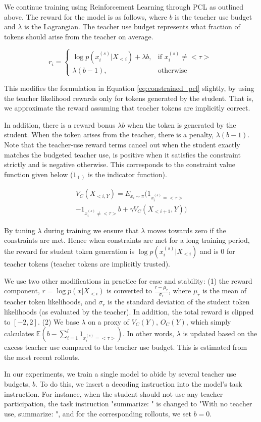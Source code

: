 We continue training using Reinforcement Learning through PCL as outlined above. The reward for the model is as follows, where $b$ is the teacher use budget and $\lambda$ is the Lagrangian. The teacher use budget represents what fraction of tokens should arise from the teacher on average.

\begin{equation}
    r_i = \begin{cases}
        \log p(x^{(s)}_i|X_{<i}) + \lambda b,&\text{if }x^{(s)}_i \neq <\tau> \\
        \lambda(b - 1), &\text{otherwise} \label{eq:rewards}
    \end{cases}
\end{equation}

This modifies the formulation in Equation \ref{eq:constrained_pcl} slightly, by using the teacher likelihood rewards only for tokens generated by the student. That is, we approximate the reward assuming that teacher tokens are implicitly correct.

In addition, there is a reward bonus $\lambda b$ when the token is generated by the student. When the token arises from the teacher, there is a penalty, $\lambda(b - 1)$.  Note that the teacher-use reward terms cancel out when the student exactly matches the budgeted teacher use, is positive when it satisfies the constraint strictly and is negative otherwise. This corresponds to the constraint value function given below ($1_{()}$ is the indicator function).

\begin{align}
    V_C(X_{<i, Y}) = E_{x_i \sim \pi}\Big(1_{x^{(s)}_i = <\tau>} \nonumber \\
    - 1_{x^{(s)}_i \neq <\tau>} b + \gamma V_C(X_{<i+1}, Y)\Big)
\end{align}

By tuning $\lambda$ during training we ensure that $\lambda$ moves towards zero if the constraints are met. Hence when constraints are met for a long training period, the reward for student token generation is $\log p(x^{(s)}_i|X_{<i})$ and is $0$ for teacher tokens (teacher tokens are implicitly trusted).

We use two other modifications in practice for ease and stability: (1) the reward component, $r = \log p(x|X_{<i})$ is converted to $\frac{r - \mu_r}{\sigma_r}$, where $\mu_r$ is the mean of teacher token likelihoods, and $\sigma_r$ is the standard deviation of the student token likelihoods (as evaluated by the teacher). In addition, the total reward is clipped to $[-2, 2]$. (2) We base $\lambda$ on a proxy of $V_C(Y)$, $O_C(Y)$, which simply calculates $\mathbb{E}(b - \sum_{i=1}^{l}1_{x^{(s)}_i = <\tau>})$. In other words, $\lambda$ is updated based on the excess teacher use compared to the teacher use budget. This is estimated from the most recent rollouts.

In our experiments, we train a single model to abide by several teacher use budgets, $b$.  To do this, we insert a decoding instruction into the model's task instruction. For instance, when the student should not use any teacher participation, the task instruction "summarize: " is changed to "With no teacher use, summarize: ", and for the corresponding rollouts, we set $b=0$.
